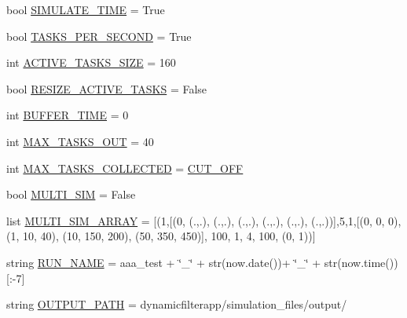 \begin{DoxyCompactItemize}
bool \hyperlink{namespacedynamicfilterapp_1_1toggles_af689b6dbf6a3a082bbfb9f6decf1a805}{S\+I\+M\+U\+L\+A\+T\+E\+\_\+\+T\+I\+ME} = True
\item 
bool \hyperlink{namespacedynamicfilterapp_1_1toggles_a61ac104de71d68599b307f679baf3ea0}{T\+A\+S\+K\+S\+\_\+\+P\+E\+R\+\_\+\+S\+E\+C\+O\+ND} = True
\item 
int \hyperlink{namespacedynamicfilterapp_1_1toggles_a374727dba0574510b39c1e2871f69e48}{A\+C\+T\+I\+V\+E\+\_\+\+T\+A\+S\+K\+S\+\_\+\+S\+I\+ZE} = 160
\item 
bool \hyperlink{namespacedynamicfilterapp_1_1toggles_ac82a59d01e707324a65d0af9b82c7f59}{R\+E\+S\+I\+Z\+E\+\_\+\+A\+C\+T\+I\+V\+E\+\_\+\+T\+A\+S\+KS} = False
\item 
int \hyperlink{namespacedynamicfilterapp_1_1toggles_a04a9eab148403f1f27d44b38211aad04}{B\+U\+F\+F\+E\+R\+\_\+\+T\+I\+ME} = 0
\item 
int \hyperlink{namespacedynamicfilterapp_1_1toggles_a27cea6b210bbcb9af3fbd7edc3901390}{M\+A\+X\+\_\+\+T\+A\+S\+K\+S\+\_\+\+O\+UT} = 40
\item 
int \hyperlink{namespacedynamicfilterapp_1_1toggles_aa05c90c0672e9b74717bdeabb00fd1bb}{M\+A\+X\+\_\+\+T\+A\+S\+K\+S\+\_\+\+C\+O\+L\+L\+E\+C\+T\+ED} = \hyperlink{namespacedynamicfilterapp_1_1toggles_a914791c176a78c026dc76a18bcd88d73}{C\+U\+T\+\_\+\+O\+FF}
\item 
bool \hyperlink{namespacedynamicfilterapp_1_1toggles_a8822be27c516d0f027cff60d067b6d87}{M\+U\+L\+T\+I\+\_\+\+S\+IM} = False
\item 
list \hyperlink{namespacedynamicfilterapp_1_1toggles_a220d8cf87bacce3b4d63c494c95b918e}{M\+U\+L\+T\+I\+\_\+\+S\+I\+M\+\_\+\+A\+R\+R\+AY} = \mbox{[}(1,\mbox{[}(0, (.,.), (.,.), (.,.), (.,.), (.,.), (.,.))\mbox{]},5,1,\mbox{[}(0, 0, 0), (1, 10, 40), (10, 150, 200), (50, 350, 450)\mbox{]}, 100, 1, 4, 100, (0, 1))\mbox{]}
\item 
string \hyperlink{namespacedynamicfilterapp_1_1toggles_a1e90a00628c373ad2f7e63b20ba08b9c}{R\+U\+N\+\_\+\+N\+A\+ME} = \textquotesingle{}aaa\+\_\+test\textquotesingle{} + \char`\"{}\+\_\+\char`\"{} + str(now.\+date())+ \char`\"{}\+\_\+\char`\"{} + str(now.\+time())\mbox{[}\+:-\/7\mbox{]}
\item 
string \hyperlink{namespacedynamicfilterapp_1_1toggles_a04644ded1d5e3fc8bd58a411209b7886}{O\+U\+T\+P\+U\+T\+\_\+\+P\+A\+TH} = \textquotesingle{}dynamicfilterapp/simulation\+\_\+files/output/\textquotesingle{}
\item 

\end{DoxyCompactItemize}
